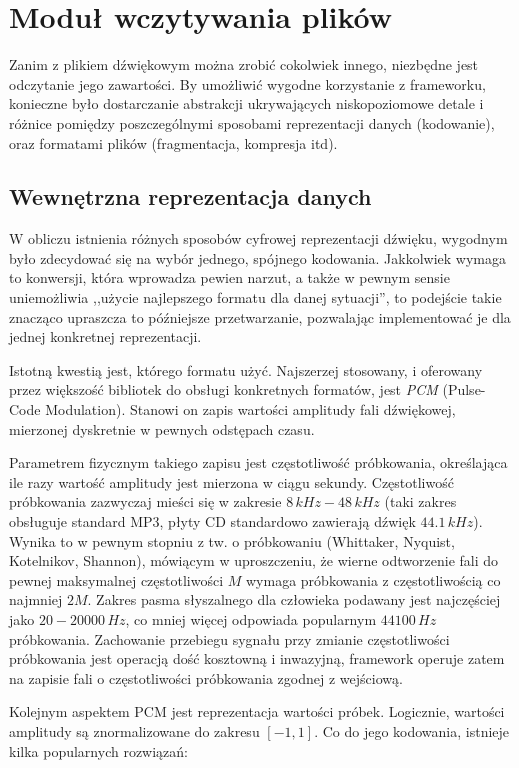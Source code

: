 
\section{Moduł wczytywania plików}

Zanim z plikiem dźwiękowym można zrobić cokolwiek innego, niezbędne jest odczytanie jego zawartości.
By umożliwić wygodne korzystanie z frameworku, konieczne było dostarczanie abstrakcji ukrywających
niskopoziomowe detale i różnice pomiędzy poszczególnymi sposobami reprezentacji danych (kodowanie),
oraz formatami plików (fragmentacja, kompresja itd). 

\subsection{Wewnętrzna reprezentacja danych}

W obliczu istnienia różnych sposobów cyfrowej reprezentacji dźwięku, wygodnym było zdecydować się na
wybór jednego, spójnego kodowania. Jakkolwiek wymaga to konwersji, która wprowadza pewien narzut, a
także w pewnym sensie uniemożliwia ,,użycie najlepszego formatu dla danej sytuacji'', to podejście
takie znacząco upraszcza to późniejsze przetwarzanie, pozwalając implementować je dla jednej
konkretnej reprezentacji.

Istotną kwestią jest, którego formatu użyć. Najszerzej stosowany, i oferowany przez większość
bibliotek do obsługi konkretnych formatów, jest \emph{PCM} (Pulse-Code Modulation). Stanowi on zapis
wartości amplitudy fali dźwiękowej, mierzonej dyskretnie w pewnych odstępach czasu. 

Parametrem fizycznym takiego zapisu jest częstotliwość próbkowania, określająca ile razy wartość
amplitudy jest mierzona w ciągu sekundy. Częstotliwość próbkowania zazwyczaj mieści się w zakresie
$8\,kHz - 48\,kHz$ (taki zakres obsługuje standard MP3, płyty CD standardowo zawierają dźwięk
$44.1\,kHz$).  Wynika to w pewnym stopniu z tw. o próbkowaniu (Whittaker, Nyquist, Kotelnikov,
Shannon), mówiącym w uproszczeniu, że wierne odtworzenie fali do pewnej maksymalnej częstotliwości
$M$ wymaga próbkowania z częstotliwością co najmniej $2M$. Zakres pasma słyszalnego dla człowieka
podawany jest najczęściej jako $20-20000\,Hz$, co mniej więcej odpowiada popularnym $44100\,Hz$
próbkowania. Zachowanie przebiegu sygnału przy zmianie częstotliwości próbkowania jest operacją dość
kosztowną i inwazyjną, framework operuje zatem na zapisie fali o częstotliwości próbkowania zgodnej
z wejściową.

Kolejnym aspektem PCM jest reprezentacja wartości próbek. Logicznie, wartości amplitudy są
znormalizowane do zakresu $[-1, 1]$. Co do jego kodowania, istnieje kilka popularnych rozwiązań:

